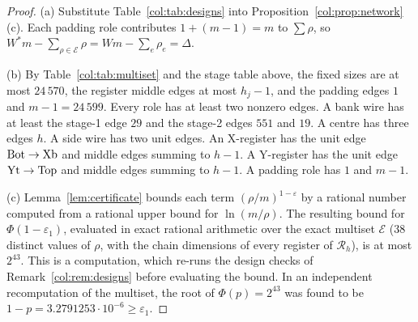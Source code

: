 \begin{proof}
(a) Substitute Table~\ref{col:tab:designs} into Proposition~\ref{col:prop:network}(c). Each padding role
contributes $1+(m-1)=m$ to $\sum\rho$, so $W^*m-\sum_{\rho\in\mathcal E}\rho=Wm-\sum_e\rho_e=\Delta$.

(b) By Table~\ref{col:tab:multiset} and the stage table above, the fixed sizes are at most $24\,570$, the
register middle edges at most $h_j-1$, and the padding edges $1$ and $m-1=24\,599$. Every role has at
least two nonzero edges. A bank wire has at least the stage-1 edge $29$ and the stage-2 edges $551$ and
$19$. A centre has three edges $h$. A side wire has two unit edges. An X-register has the unit edge
$\mathrm{Bot}\to\mathrm{Xb}$ and middle edges summing to $h-1$. A Y-register has the unit edge $\mathrm{Yt}\to\mathrm{Top}$
and middle edges summing to $h-1$. A padding role has $1$ and $m-1$.

(c) Lemma~\ref{lem:certificate} bounds each term $(\rho/m)^{1-\varepsilon}$ by a rational number computed
from a rational upper bound for $\ln(m/\rho)$. The resulting bound for $\Phi(1-\varepsilon_1)$, evaluated in
exact rational arithmetic over the exact multiset $\mathcal E$ (38 distinct values of $\rho$, with the
chain dimensions of every register of $\mathcal R_h$), is at most $2^{43}$. This is a computation,
which re-runs the design checks of Remark~\ref{col:rem:designs} before evaluating the bound. In an
independent recomputation of the multiset, the root of $\Phi(p)=2^{43}$ was found to be $1-p=3.2791253\cdot10^{-6}\ge\varepsilon_1$.


\end{proof}
